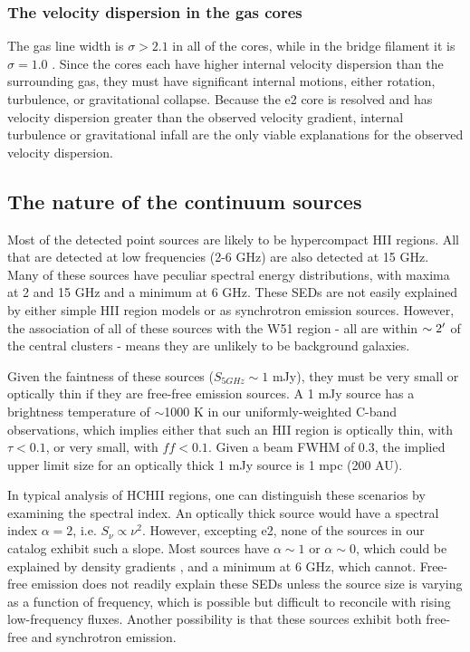 \subsubsection{The velocity dispersion in the gas cores}
The gas line width is $\sigma>2.1$ \kms in all of the cores, while in the
bridge filament it is $\sigma=1.0$ \kms.  Since the cores each have higher
internal velocity dispersion than the surrounding gas, they must have
significant internal motions, either rotation, turbulence, or gravitational
collapse.  Because the e2 core is resolved and has velocity dispersion greater
than the observed velocity gradient, internal turbulence or gravitational
infall are the only viable explanations for the observed velocity dispersion.

\subsection{The nature of the continuum sources}
Most of the detected point sources are likely to be hypercompact HII regions.
All that are detected at low frequencies (2-6 GHz) are also detected at 15 GHz.
Many of these sources have peculiar spectral energy distributions, with maxima
at 2 and 15 GHz and a minimum at 6 GHz.  These SEDs are not easily explained by
either simple HII region models or as synchrotron emission sources.  However,
the association of all of these sources with the W51 region - all are within
$\sim2\mbox{$^\prime$}$ of the central clusters - means they are unlikely to be
background galaxies.  

Given the faintness of these sources ($S_{5 GHz} \sim 1$ mJy), they must be
very small or optically thin if they are free-free emission sources.  A 1 mJy
source has a brightness temperature of $\sim$1000 K in our uniformly-weighted
C-band observations, which implies either that such an HII region is optically
thin, with $\tau < 0.1$, or very small, with $ff<0.1$.  Given a beam FWHM of
0.3\arcsec, the implied upper limit size for an optically thick 1 mJy source is
1 mpc (200 AU).

In typical analysis of HCHII regions, one can distinguish these scenarios by
examining the spectral index.  An optically thick source would have a spectral
index $\alpha=2$, i.e. $S_\nu \propto \nu^2$.  However, excepting e2, none of
the sources in our catalog exhibit such a slope.  Most sources have
$\alpha\sim1$ or $\alpha\sim0$, which could be explained by density gradients
\citep{Keto2008a,Galvan-Madrid2009a}, and a minimum at 6 GHz, which cannot.
Free-free emission does not readily explain these SEDs unless the source size
is varying as a function of frequency, which is possible but difficult to
reconcile with rising low-frequency fluxes.  Another possibility is that these
sources exhibit both free-free and synchrotron emission.

